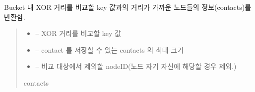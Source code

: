\documentclass[a4paper,10pt,english]{sphinxmanual}
\begin{document}
\begin{fulllineitems}
\begin{fulllineitems}
\begin{quote}
\begin{description}
\end{description}\end{quote}

\end{fulllineitems}


\begin{fulllineitems}
\label{\detokenize{_kademlia:KNode._findClosestNodes}}
\pysigstartsignatures
{}
\pysigstopsignatures
\sphinxAtStartPar
Bucket 내 XOR 거리를 비교할 key 값과의 거리가 가까운 노드들의 정보(contacts)를 반환함.
\begin{quote}\begin{description}
\begin{itemize}
\item {} 
\sphinxAtStartPar
{} – XOR 거리를 비교할 key 값

\item {} 
\sphinxAtStartPar
{} – contact 를 저장할 수 있는 contacts 의 최대 크기

\item {} 
\sphinxAtStartPar
{} – 비교 대상에서 제외할 nodeID(노드 자기 자신에 해당할 경우 제외.)

\end{itemize}

\sphinxAtStartPar
contacts

\end{description}\end{quote}

\end{fulllineitems}



\end{fulllineitems}
\end{document}
